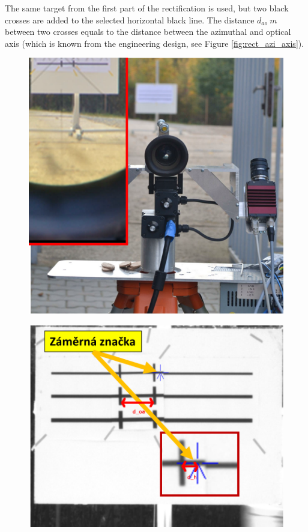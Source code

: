 The same target from the first part of the rectification is used, but two black crosses are added to the selected horizontal black line. The distance $d_{ao}\ m$ between two crosses equals to the distance between the azimuthal and optical axis (which is known from the engineering design, see Figure \ref{fig:rect_azi_axis}). 

\begin{figure}[htb]
	\centering
	\begin{minipage}{.42\textwidth}
		\centering
		\includegraphics[width=.99\linewidth]{fig/rect_telescope.png}
		\label{fig:rect_telescope}
	\end{minipage}
	\hfill
	\begin{minipage}{.54\textwidth}
		\centering
		\includegraphics[width=.99\linewidth]{fig/rect_azi_axis.png}

\end{minipage}
\end{figure}
